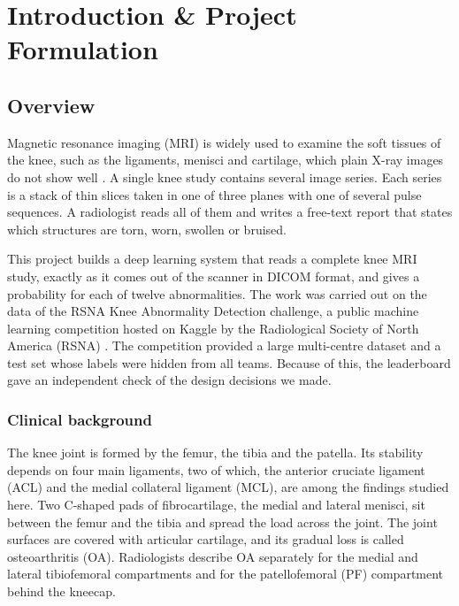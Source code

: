 \chapter[INTRODUCTION \& PROJECT FORMULATION]{Introduction \& Project Formulation}
\label{ch:intro}

\section{Overview}

Magnetic resonance imaging (MRI) is widely used to examine the soft tissues of the knee, such as the ligaments, menisci and cartilage, which plain X-ray images do not show well \cite{bien2018}. A single knee study contains several image series. Each series is a stack of thin slices taken in one of three planes with one of several pulse sequences. A radiologist reads all of them and writes a free-text report that states which structures are torn, worn, swollen or bruised.

This project builds a deep learning system that reads a complete knee MRI study, exactly as it comes out of the scanner in DICOM format, and gives a probability for each of twelve abnormalities. The work was carried out on the data of the RSNA Knee Abnormality Detection challenge, a public machine learning competition hosted on Kaggle by the Radiological Society of North America (RSNA) \cite{kaggle_rsna_knee,rsna2026announce}. The competition provided a large multi-centre dataset and a test set whose labels were hidden from all teams. Because of this, the leaderboard gave an independent check of the design decisions we made.

\subsection{Clinical background}

The knee joint is formed by the femur, the tibia and the patella. Its stability depends on four main ligaments, two of which, the anterior cruciate ligament (ACL) and the medial collateral ligament (MCL), are among the findings studied here. Two C-shaped pads of fibrocartilage, the medial and lateral menisci, sit between the femur and the tibia and spread the load across the joint. The joint surfaces are covered with articular cartilage, and its gradual loss is called osteoarthritis (OA). Radiologists describe OA separately for the medial and lateral tibiofemoral compartments and for the patellofemoral (PF) compartment behind the kneecap.

